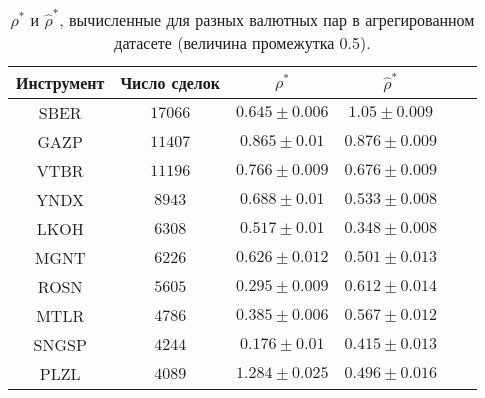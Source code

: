 \begin{table}[h!]
    \begin{center}
        \begin{tabular}{|c|c|c|c|c|c|}
            \hline
            Инструмент & Число сделок & $\rho^*$ & $\hat \rho^*$            \\ \hline
            SBER & $17066$ & $0.645 \pm 0.006$ & $1.05 \pm 0.009$ \\ \hline
            GAZP       & $11407$      & $0.865 \pm 0.01$  & $0.876 \pm 0.009$ \\ \hline
            VTBR       & $11196$      & $0.766 \pm 0.009$ & $0.676 \pm 0.009$ \\ \hline
            YNDX       & $8943$       & $0.688 \pm 0.01$  & $0.533 \pm 0.008$ \\ \hline
            LKOH       & $6308$       & $0.517 \pm 0.01$  & $0.348 \pm 0.008$ \\ \hline
            MGNT       & $6226$       & $0.626 \pm 0.012$ & $0.501 \pm 0.013$ \\ \hline
            ROSN       & $5605$       & $0.295 \pm 0.009$ & $0.612 \pm 0.014$ \\ \hline
            MTLR       & $4786$       & $0.385 \pm 0.006$ & $0.567 \pm 0.012$ \\ \hline
            SNGSP      & $4244$       & $0.176 \pm 0.01$  & $0.415 \pm 0.013$ \\ \hline
            PLZL       & $4089$       & $1.284 \pm 0.025$ & $0.496 \pm 0.016$ \\ \hline
        \end{tabular}
    \end{center}\caption{$\rho^*$ и $\hat \rho^*$, вычисленные для разных валютных пар в агрегированном датасете (величина промежутка 0.5).}
    \label{Aggreg1CU0.5} \end{table}

